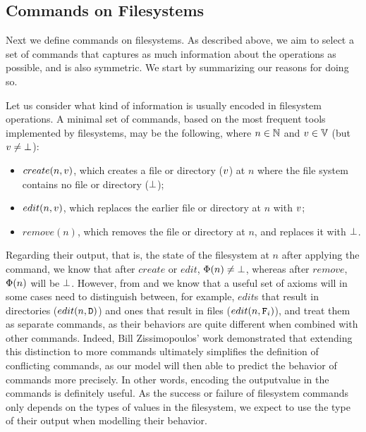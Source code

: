 
\subsection{Commands on Filesystems}


Next we define commands on filesystems.
As described above, we aim to select a set of commands
that captures as much information
about the operations as possible, and is also symmetric.
We start by summarizing our reasons for doing so.

Let us consider what kind of information is usually encoded in filesystem operations.
A minimal set of commands, based on the most frequent tools implemented by filesystems,
may be the following, where 
$n\in\mathbb{N}$ and $v\in\mathbb{V}$ (but $v\neq\bot$):
\begin{itemize}
\item $create(n,v)$, which creates a file or directory ($v$) at $n$
where the file system contains no file or directory ($\bot$);
\item $edit(n,v)$, which replaces the earlier file or directory at $n$ with $v$;
\item $remove(n)$, which removes the file or directory at $n$, and replaces it with $\bot$.
\end{itemize}
Regarding their output, that is, the state of the filesystem at $n$
after applying the command,
we know that after $create$ or $edit$, $\Phi(n)\neq\bot$, whereas after $remove$,
$\Phi(n)$ will be $\bot$. 
However, from \cite{NREC} and \cite{CBNR} we know that a useful set of axioms
will in some cases need to distinguish between, for example,
$edit$s that result in directories ($edit(n,\mathtt{D})$) and
ones that result in files ($edit(n,\mathtt{F}_i)$), and treat them as separate commands,
as their behaviors are quite different when combined with other commands.
Indeed, Bill Zissimopoulos' work
demonstrated \cite{BZ}
that extending this distinction to more commands ultimately simplifies
the definition of conflicting commands, as our model will then able to predict the behavior of commands
more precisely.
In other words, encoding the outputvalue in the commands is definitely useful.
As the success or failure of filesystem commands only depends on the types of values in the filesystem,
we expect to use the type of their output when modelling their behavior.

